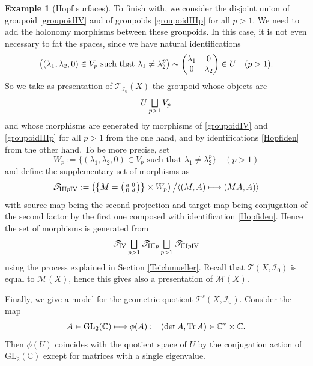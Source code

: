 \documentclass[10pt]{amsart}
\let\mathcal\mathscr
\let\oldbigsqcup\bigsqcup
\renewcommand{\bigsqcup}{\mathop{\textstyle\oldbigsqcup}\displaylimits}
\def\mto{\mathchoice{\longmapsto}{\mapsto}{\mapsto}{\mapsto}}
\newenvironment{smallpmatrix}{\big(\begin{smallmatrix}}{\end{smallmatrix}\big)}
\newcommand{\GL}{\mathrm{GL}}
\DeclareMathOperator{\Tr}{Tr}
\theoremstyle{plain}
\theoremstyle{definition}
\newtheorem{example}[theorem]{Example}
\theoremstyle{remark}
\numberwithin{equation}{section}
\newcommand{\CC}{{\mathbb{C}}}
\newcommand{\cI}{\mathcal{I}}
\let\uniondisjointe\bigsqcup
\begin{document}
\begin{example}[Hopf surfaces]
To finish with, we consider the disjoint union of groupoid \eqref{groupoidIV} and of groupoids \eqref{groupoidIIIp} for all $p>1$. We need to add the holonomy morphisms between these groupoids.
In this case, it is not even necessary to fat the spaces, since we have natural identifications
\begin{equation}
\label{Hopfiden}
\big ((\lambda_1,\lambda_2,0)\in V_p \text{ such that } \lambda_1\not = \lambda_2^p\big )\sim
\begin{pmatrix}
\lambda_1 &0\cr
0 &\lambda_2
\end{pmatrix}
\in U
\quad (p>1).
\end{equation}
So we take as presentation of $\mathcal T_{\cI_0} (X)$ the groupoid whose objects are
\begin{equation}
\label{Hopfobjects}
U\uniondisjointe_{p>1} V_p
\end{equation}
and whose morphisms are generated by morphisms of \eqref{groupoidIV} and \eqref{groupoidIIIp} for all $p>1$ from the one hand, and by identifications \eqref{Hopfiden} from the other hand. To be more precise, set
\begin{equation}
\label{morphismssuppHopf}
W_p:=\{(\lambda_1,\lambda_2,0)\in V_p \text{ such that } \lambda_1\not = \lambda_2^p\}\quad (p>1)
\end{equation}
and define the supplementary set of morphisms as
\begin{equation}
\label{TIIIpIV}
\mathcal T_{\mathrm{III}p\mathrm{IV}}:=\left (\left\{M=
\begin{smallpmatrix}
a &0\cr
0 &d
\end{smallpmatrix}
\right \}
\times W_p\right )\big / \langle (M,A)\mto (MA, A)\rangle
\end{equation}
with source map being the second projection and target map being conjugation of the second factor by the first one composed with identification \eqref{Hopfiden}.
Hence the set of morphisms is generated from
\begin{equation}
\label{morphismsHopf}
\mathcal T_\mathrm{IV}\uniondisjointe_{p>1}\mathcal T_{\mathrm{III}p}\uniondisjointe_{p>1}\mathcal T_{\mathrm{III}p\mathrm{IV}}
\end{equation}
using the process explained in Section \ref{Teichmueller}.
Recall that $\mathcal T(X,\cI_0)$ is equal to $\mathcal M(X)$, hence this gives also a presentation of $\mathcal M(X)$.

Finally, we give a model for the geometric quotient $\mathcal T^s(X,\cI_0)$. Consider the map
\begin{equation}
\label{dettrace}
A\in\GL_2(\CC)\mto \phi(A):=(\det A,\Tr A)\in\CC^*\times\CC.
\end{equation}
Then $\phi(U)$ coincides with the quotient space of $U$ by the conjugation action of $\GL_2(\CC)$ except for matrices with a single eigenvalue.


\end{example}
\end{document}
